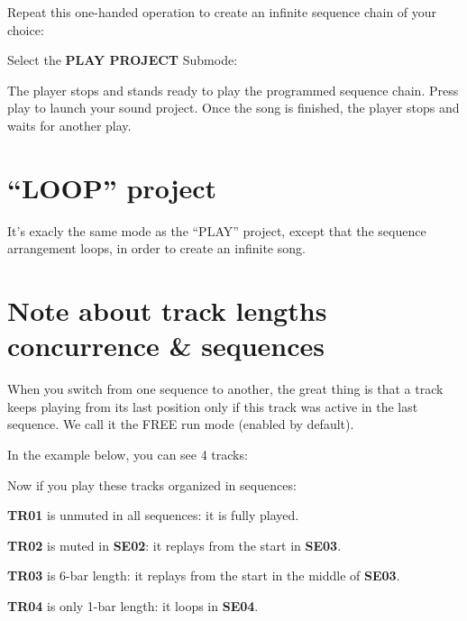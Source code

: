 
Repeat this one-handed operation to create an infinite sequence chain of your choice:


Select the \textbf{PLAY PROJECT} Submode:


The player stops and stands ready to play the programmed sequence chain. Press play \playicon{} to launch your sound project. Once the song is finished, the player stops and waits for another play.



\section{“LOOP” project}

It's exacly the same mode as the ``PLAY'' project, except that the sequence arrangement loops, in order to create an infinite song.



\section{Note about track lengths concurrence \& sequences}

When you switch from one sequence to another, the great thing is that a track keeps playing from its last position only if this track was active in the last sequence. We call it the FREE run mode (enabled by default).

In the example below, you can see 4 tracks:


Now if you play these tracks organized in sequences:


\textbf{TR01} is unmuted in all sequences: it is fully played.

\textbf{TR02} is muted in \textbf{SE02}: it replays from the start in \textbf{SE03}.

\textbf{TR03} is 6-bar length: it replays from the start in the middle of \textbf{SE03}.

\textbf{TR04} is only 1-bar length: it loops in \textbf{SE04}.


